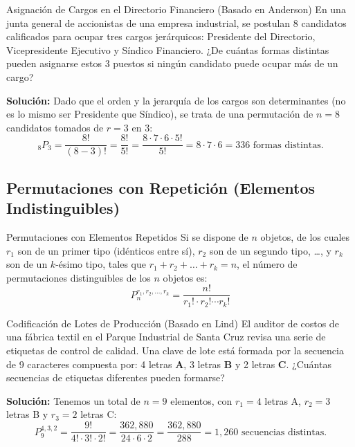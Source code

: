 \begin{ejemplo}{Asignación de Cargos en el Directorio Financiero (Basado en Anderson)}
En una junta general de accionistas de una empresa industrial, se postulan 8 candidatos calificados para ocupar tres cargos jerárquicos: Presidente del Directorio, Vicepresidente Ejecutivo y Síndico Financiero. ¿De cuántas formas distintas pueden asignarse estos 3 puestos si ningún candidato puede ocupar más de un cargo?

\tcbline
\textbf{Solución:}
Dado que el orden y la jerarquía de los cargos son determinantes (no es lo mismo ser Presidente que Síndico), se trata de una permutación de $n = 8$ candidatos tomados de $r = 3$ en $3$:
\[
{}_8 P_3 = \frac{8!}{(8-3)!} = \frac{8!}{5!} = \frac{8 \cdot 7 \cdot 6 \cdot 5!}{5!} = 8 \cdot 7 \cdot 6 = 336 \text{ formas distintas.}
\]
\end{ejemplo}

\subsection{Permutaciones con Repetición (Elementos Indistinguibles)}
\begin{definicion}{Permutaciones con Elementos Repetidos}
Si se dispone de $n$ objetos, de los cuales $r_1$ son de un primer tipo (idénticos entre sí), $r_2$ son de un segundo tipo, \dots, y $r_k$ son de un $k$-ésimo tipo, tales que $r_1 + r_2 + \dots + r_k = n$, el número de permutaciones distinguibles de los $n$ objetos es:
\begin{equation}
    P_n^{r_1, r_2, \dots, r_k} = \frac{n!}{r_1! \cdot r_2! \dotsm r_k!}
\end{equation}
\end{definicion}

\begin{ejemplo}{Codificación de Lotes de Producción (Basado en Lind)}
El auditor de costos de una fábrica textil en el Parque Industrial de Santa Cruz revisa una serie de etiquetas de control de calidad. Una clave de lote está formada por la secuencia de 9 caracteres compuesta por: 4 letras \textbf{A}, 3 letras \textbf{B} y 2 letras \textbf{C}. ¿Cuántas secuencias de etiquetas diferentes pueden formarse?

\tcbline
\textbf{Solución:}
Tenemos un total de $n = 9$ elementos, con $r_1 = 4$ letras A, $r_2 = 3$ letras B y $r_3 = 2$ letras C:
\[
P_9^{4, 3, 2} = \frac{9!}{4! \cdot 3! \cdot 2!} = \frac{362{,}880}{24 \cdot 6 \cdot 2} = \frac{362{,}880}{288} = 1{,}260 \text{ secuencias distintas.}
\]
\end{ejemplo}

